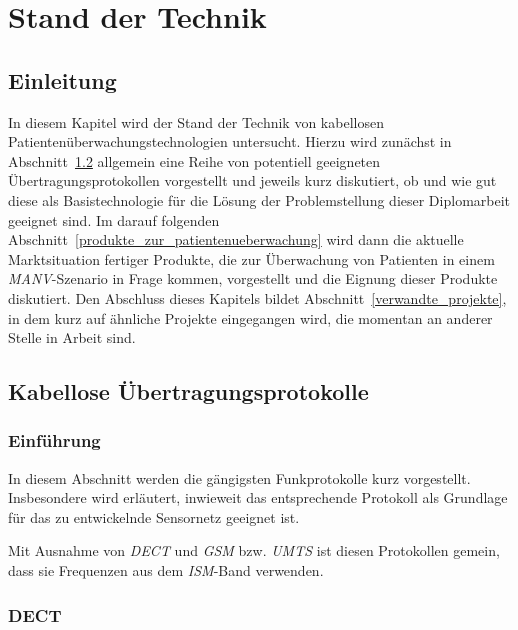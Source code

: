 
\chapter{Stand der Technik}\label{Stand der Technik}

\section{Einleitung}
In diesem Kapitel wird der Stand der Technik von kabellosen Patientenüberwachungstechnologien untersucht. 
Hierzu wird zunächst in Abschnitt~\ref{kabellose_uebertragungsprotokolle} allgemein eine Reihe von potentiell
geeigneten Übertragungsprotokollen vorgestellt und jeweils kurz diskutiert, ob und wie gut diese als 
Basistechnologie für die Lösung der Problemstellung dieser Diplomarbeit geeignet sind. Im darauf folgenden
Abschnitt~\ref{produkte_zur_patientenueberwachung} wird dann die aktuelle Marktsituation fertiger Produkte,
die zur Überwachung von Patienten in einem \emph{MANV}-Szenario in Frage kommen, vorgestellt und die Eignung dieser
Produkte diskutiert. Den Abschluss dieses Kapitels bildet Abschnitt~\ref{verwandte_projekte}, in dem
kurz auf ähnliche Projekte eingegangen wird, die momentan an anderer Stelle in Arbeit sind.

\section{Kabellose Übertragungsprotokolle}\label{kabellose_uebertragungsprotokolle}
    \subsection{Einführung}
        In diesem Abschnitt werden die gängigsten Funkprotokolle kurz vorgestellt. Insbesondere wird erläutert,
        inwieweit das entsprechende Protokoll als Grundlage für das zu entwickelnde Sensornetz geeignet ist.

        Mit Ausnahme von \emph{DECT} und \emph{GSM} bzw. \emph{UMTS} ist diesen Protokollen gemein, dass 
        sie Frequenzen aus dem \emph{ISM}-Band verwenden. 

    \subsection{DECT}

